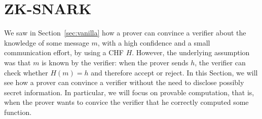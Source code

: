 \section{ZK-SNARK}\label{sec:zksnark}
We saw in Section~\ref{sec:vanilla} how a prover can convince a verifier about the knowledge of
some message \(m\), with a high confidence and a small communication effort, by using a CHF \(H\).
However, the underlying assumption was that \(m\) is known by the verifier: when the prover sends
\(h\), the verifier can check whether \(H(m) = h\) and therefore accept or reject.
In this Section, we will see how a prover can convince a verifier without the need to disclose 
possibly secret information.
In particular, we will focus on provable computation, that is, when the prover wants to convice
the verifier that he correctly computed some function.



